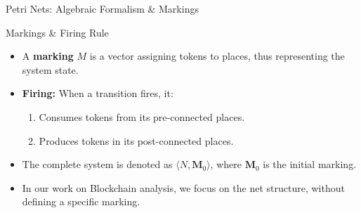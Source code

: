 \documentclass{beamer}
\begin{document}
\begin{frame}{Petri Nets: Algebraic Formalism \& Markings}
    \begin{block}{Markings \& Firing Rule}
        \begin{itemize}
            \item A \textbf{marking} \(M\) is a vector assigning tokens to places, thus representing the system state.
            \item \textbf{Firing:} When a transition fires, it:
                  \begin{enumerate}
                      \item Consumes tokens from its pre-connected places.
                      \item Produces tokens in its post-connected places.
                  \end{enumerate}
            \item The complete system is denoted as \(\langle N, \mathbf{M}_0 \rangle\), where \(\mathbf{M}_0\) is the initial marking.
            \item In our work on Blockchain analysis, we focus on the net structure, without defining a specific marking.
        \end{itemize}
    \end{block}

\end{frame}
\end{document}
